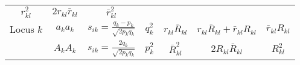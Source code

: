 \documentclass[]{article}
\begin{document}
\begin{longtable}[]{@{}ccccccc@{}}
\begin{minipage}[t]{0.12\columnwidth}
\(r_{kl}^2\)\strut
\end{minipage} & \begin{minipage}[t]{0.12\columnwidth}\centering
\(2r_{kl}\bar{r}_{kl}\)\strut
\end{minipage} & \begin{minipage}[t]{0.12\columnwidth}\centering
\(\bar{r}_{kl}^2\)\strut
\end{minipage}\tabularnewline
\begin{minipage}[t]{0.12\columnwidth}\centering
Locus \(k\)\strut
\end{minipage} & \begin{minipage}[t]{0.12\columnwidth}\centering
\(a_ka_k\)\strut
\end{minipage} & \begin{minipage}[t]{0.12\columnwidth}\centering
\(s_{ik}=\frac{q_k-p_k}{\sqrt{2p_kq_k}}\)\strut
\end{minipage} & \begin{minipage}[t]{0.12\columnwidth}\centering
\(q_k^2\)\strut
\end{minipage} & \begin{minipage}[t]{0.12\columnwidth}\centering
\(r_{kl}\bar{R}_{kl}\)\strut
\end{minipage} & \begin{minipage}[t]{0.12\columnwidth}\centering
\(r_{kl}\bar{R}_{kl}+\bar{r}_{kl}R_{kl}\)\strut
\end{minipage} & \begin{minipage}[t]{0.12\columnwidth}\centering
\(\bar{r}_{kl}R_{kl}\)\strut
\end{minipage}\tabularnewline
\begin{minipage}[t]{0.12\columnwidth}\centering
\strut
\end{minipage} & \begin{minipage}[t]{0.12\columnwidth}\centering
\(A_kA_k\)\strut
\end{minipage} & \begin{minipage}[t]{0.12\columnwidth}\centering
\(s_{ik}=\frac{2q_k}{\sqrt{2p_kq_k}}\)\strut
\end{minipage} & \begin{minipage}[t]{0.12\columnwidth}\centering
\(p_k^2\)\strut
\end{minipage} & \begin{minipage}[t]{0.12\columnwidth}\centering
\(\bar{R}_{kl}^2\)\strut
\end{minipage} & \begin{minipage}[t]{0.12\columnwidth}\centering
\(2R_{kl}\bar{R}_{kl}\)\strut
\end{minipage} & \begin{minipage}[t]{0.12\columnwidth}\centering
\(R_{kl}^2\)\strut
\end{minipage}\tabularnewline
\bottomrule
\end{longtable}
\end{document}
